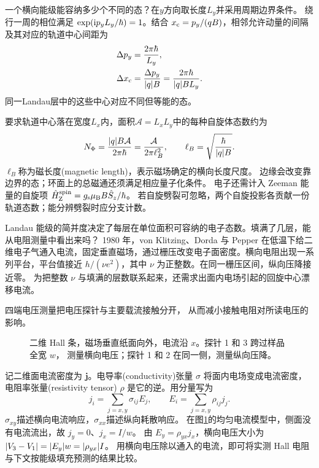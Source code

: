 一个横向能级能容纳多少个不同的态？在$y$方向取长度$L_y$并采用周期边界条件。
绕行一周的相位满足 $\exp(\mathrm{i} p_y L_y/\hbar) = 1$。结合 $x_{\mathrm{c}} = p_y/(qB)$，相邻允许动量的间隔及其对应的轨道中心间距为
\begin{subequations}
    \begin{align}
        \Delta p_y &= \frac{2\pi\hbar}{L_y},\\
        \Delta x_{\mathrm{c}} &= \frac{\Delta p_y}{\lvert q\rvert B}
                  = \frac{2\pi\hbar}{\lvert q\rvert BL_y}.
    \end{align}
\end{subequations}
同一Landau层中的这些中心对应不同但等能的态。

要求轨道中心落在宽度$L_x$内，面积$\mathcal A = L_xL_y$中的每种自旋体态数约为
\begin{equation}
    N_\Phi = \frac{\lvert q\rvert B\mathcal A}{2\pi\hbar}
    = \frac{\mathcal A}{2\pi\ell_B^2},\qquad
    \ell_B = \sqrt{\frac\hbar{\lvert q\rvert B}}.
\end{equation}
$\ell_B$称为磁长度(magnetic length)，表示磁场确定的横向长度尺度。
边缘会改变靠边界的态；环面上的总磁通还须满足相应量子化条件。
电子还需计入 Zeeman 能量的自旋项 $\hat{H}_{\mathrm{Z}}^{\mathrm{spin}} = g_{\mathrm{s}}\mu_{\mathrm{B}} B \hat{S}_z/\hbar$。
若自旋劈裂可忽略，两个自旋投影各贡献一份轨道态数；能分辨劈裂时应分支计数。

\label{sec:qm-integer-hall}

Landau 能级的简并度决定了每层在单位面积可容纳的电子态数。填满了几层，能从电阻测量中看出来吗？
1980 年，von Klitzing、Dorda 与 Pepper 在低温下给二维电子气通入电流，固定垂直磁场，通过栅压改变电子面密度。横向电阻出现一系列平台，平台值接近 $h/(\nu e^2)$，其中 $\nu$ 为正整数。在同一栅压区间，纵向压降接近零\cite{qhe}。
为把整数 $\nu$ 与填满的层数联系起来，还需求出面内电场引起的回旋中心漂移电流。

四端电压测量把电压探针与主要载流接触分开，
从而减小接触电阻对所读电压的影响。
\begin{figure}[htbp]
    \centering
    \caption{二维 Hall 条，磁场垂直纸面向外，电流沿 $x$。探针 1 和 3 跨过样品全宽 $w$，
        测量横向电压；探针 1 和 2 在同一侧，测量纵向压降。}
    \label{fig:hall-voltage}
\end{figure}

记二维面电流密度为 $\bm j$。电导率(conductivity)张量 $\sigma$ 将面内电场变成电流密度，
电阻率张量(resistivity tensor) $\rho$ 是它的逆。用分量写为
\begin{equation}\label{eq:qm-conductivity-resistivity}
    j_i = \sum_{j=x,y}\sigma_{ij}E_j,\qquad
    E_i = \sum_{j=x,y}\rho_{ij}j_j .
\end{equation}
$\sigma_{xy}$描述横向电流响应，$\sigma_{xx}$描述纵向耗散响应。
在图\ref{fig:hall-voltage}的均匀电流模型中，侧面没有电流流出，故 $j_y = 0$、$j_x = I/w$。
由 $E_y = \rho_{yx}j_x$，横向电压大小为 $\lvert V_3 - V_1\rvert = \lvert E_y\rvert w = \lvert\rho_{yx}\rvert I$。
用横向电压除以通入的电流，即可将实测 Hall 电阻与下文按能级填充预测的结果比较。

